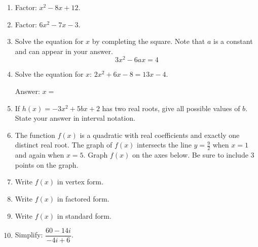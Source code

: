 \begin{enumerate}[leftmargin=*, label=\textbf{\arabic*.}]

  \item Factor: $x^2 - 8x + 12$. 
  \vgap

  \item Factor: $6x^2 - 7x - 3$. 
  \vgappp

  \item Solve the equation for $x$ by completing the square. Note that $a$ is a constant and can appear in your answer. 
  \[
  3x^2 - 6ax = 4
  \]
  \vgappp

  \item Solve the equation for $x$: $2x^2 + 6x - 8 = 13x - 4$. 

  Answer: $x = $ \blank
  \vgappp

  \item If $h(x) = -3x^2 + 5bx + 2$ has two real roots, give all possible values of $b$. State your answer in interval notation. 
  \vgappp

  \item The function $f(x)$ is a quadratic with real coefficients and exactly one distinct real root. The graph of $f(x)$ intersects the line $y = \frac{9}{2}$ when $x = 1$ and again when $x = 5$. Graph $f(x)$ on the axes below. Be sure to include 3 points on the graph. 

  \begin{center}
  \end{center}
  \vgapp

  \item Write $f(x)$ in vertex form. 
  \vgapp

  \item Write $f(x)$ in factored form. 
  \vgap

  \item Write $f(x)$ in standard form. 
  \vgappp

  \item Simplify: $\dfrac{60-14i}{-4i+6}$. 
  \vgappp


\end{enumerate}
